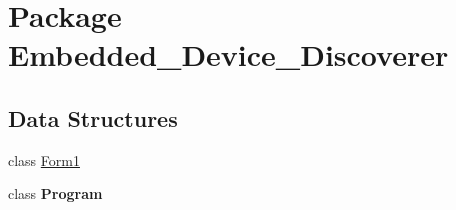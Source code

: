 \hypertarget{namespace_embedded___device___discoverer}{}\section{Package Embedded\+\_\+\+Device\+\_\+\+Discoverer}
\label{namespace_embedded___device___discoverer}
\subsection*{Data Structures}
\begin{DoxyCompactItemize}
\item 
class \hyperlink{class_embedded___device___discoverer_1_1_form1}{Form1}
\item 
class {\bfseries Program}
\end{DoxyCompactItemize}
